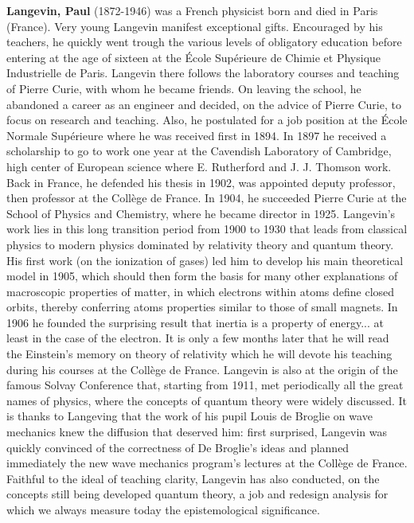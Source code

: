 \textbf{Langevin, Paul} (1872-1946) was a French physicist born and died in Paris (France). Very young Langevin manifest exceptional gifts. Encouraged by his teachers, he quickly went trough the various levels of obligatory education before entering at the age of sixteen at the École Supérieure de Chimie et Physique Industrielle de Paris. Langevin there follows the laboratory courses and teaching of Pierre Curie, with whom he became friends. On leaving the school, he abandoned a career as an engineer and decided, on the advice of Pierre Curie, to focus on research and teaching. Also, he postulated for a job position at the École Normale Supérieure where he was received first in 1894. In 1897 he received a scholarship to go to work one year at the Cavendish Laboratory of Cambridge, high center of European science where E. Rutherford and J. J. Thomson work. Back in France, he defended his thesis in 1902, was appointed deputy professor, then professor at the Collège de France. In 1904, he succeeded Pierre Curie at the School of Physics and Chemistry, where he became director in 1925. Langevin's work lies in this long transition period from 1900 to 1930 that leads from classical physics to modern physics dominated by relativity theory and quantum theory. His first work (on the ionization of gases) led him to develop his main theoretical model in 1905, which should then form the basis for many other explanations of macroscopic properties of matter, in which electrons within atoms define closed orbits, thereby conferring atoms properties similar to those of small magnets. In 1906 he founded the surprising result that inertia is a property of energy... at least in the case of the electron. It is only a few months later that he will read the Einstein's memory on theory of relativity which he will devote his teaching during his courses at the Collège de France. Langevin is also at the origin of the famous Solvay Conference that, starting from 1911, met periodically all the great names of physics, where the concepts of quantum theory were widely discussed. It is thanks to Langeving that the work of his pupil Louis de Broglie on wave mechanics knew the diffusion that deserved him: first surprised, Langevin was quickly convinced of the correctness of De Broglie's ideas and planned immediately the new wave mechanics program's lectures at the Collège de France. Faithful to the ideal of teaching clarity, Langevin has also conducted, on the concepts still being developed quantum theory, a job and redesign analysis for which we always measure today the epistemological significance.

